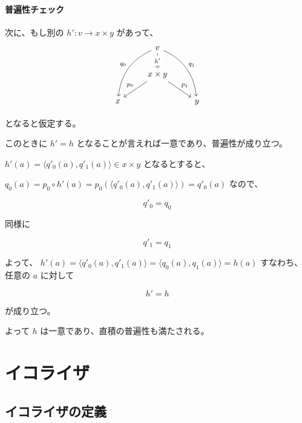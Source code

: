 \documentclass[uplatex,a4j,12pt,dvipdfmx]{jsarticle}
\begin{document}
\paragraph{普遍性チェック}

次に、もし別の $h':v \to x \times y$ があって、
\[
\begin{tikzcd}
  & v \arrow[ldd, "q_{0}"', bend right] \arrow[rdd, "q_{1}", bend left] \arrow[d, "h'" description, dashed] &   \\
  & x \times y \arrow[ld, "p_{0}"'] \arrow[rd, "p_{1}"]                                                     &   \\
x &                                                                                                         & y
\end{tikzcd}
\]

となると仮定する。

このときに $h'=h$ となることが言えれば一意であり、普遍性が成り立つ。

$h'(a) = \langle q'_{0}(a) , q'_{1}(a) \rangle \in x \times y$ となるとすると、

$q_{0}(a) = p_{0} \circ h'(a) = p_{0} (\langle q'_{0}(a) , q'_{1}(a) \rangle) = q'_{0}(a)$
なので、

$$q'_{0} = q_{0}$$

同様に

$$q'_{1} = q_{1}$$

よって、
$h'(a) = \langle q'_{0}(a) , q'_{1}(a) \rangle = \langle q_{0}(a) , q_{1}(a) \rangle = h(a)$
すなわち、任意の $a$ に対して

$$h' = h$$

が成り立つ。

よって $h$ は一意であり、直積の普遍性も満たされる。


\section{イコライザ}

\subsection{イコライザの定義}
\end{document}
